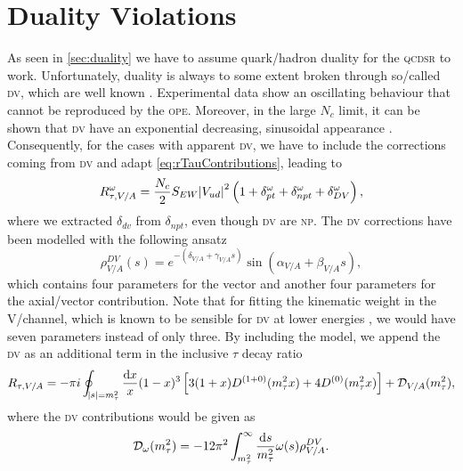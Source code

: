 \documentclass[../../index.tex]{subfiles}
\begin{document}
\section{Duality Violations}
As seen in \cref{sec:duality} we have to assume quark\-/hadron duality for the
\textsc{qcdsr} to work. Unfortunately, duality is always to some extent broken
through so\-/called \textsc{dv}, which are well known \cite{Cata2008,Cata2009}.
Experimental data show an oscillating behaviour that cannot be reproduced by the
\textsc{ope}. Moreover, in the large \(N_c\) limit, it can be shown that
\textsc{dv} have an exponential decreasing, sinusoidal appearance
\cite{Cata2005}. Consequently, for the cases with apparent \textsc{dv}, we have
to include the corrections coming from \textsc{dv} and adapt
\cref{eq:rTauContributions}, leading to
\begin{equation}
  R_{\tau,V/A}^\omega = \frac{N_c}{2}S_{EW} \abs{V_{ud}}^2 \left( 1 + \delta_{pt}^{\omega} + \delta_{npt}^{\omega} + \delta_{DV}^{\omega} \right),
\end{equation}
where we extracted \(\delta_{dv}\) from \(\delta_{npt}\), even though
\textsc{dv} are \textsc{np}. The \textsc{dv} corrections have been modelled with
the following ansatz \cite{Cata2009}
\begin{equation}
  \label{eq:dvModel}
  \rho_{V/A}^{DV}(s) = e^{-(\delta_{V/A}+\gamma_{V/A}s)} \sin(\alpha_{V/A} + \beta_{V/A}s),
\end{equation}
which contains four parameters for the vector and another four parameters for
the axial\-/vector contribution. Note that for fitting the kinematic weight in
the \textsc{V}\-/channel, which is known to be sensible for \textsc{dv} at lower
energies \cite{Boito2011a}, we would have seven parameters instead of only
three. By including the model, we append the \textsc{dv} as an additional term
in the inclusive \(\tau\) decay ratio
\begin{equation}
  R_{\tau,V/A} = - \pi i \oint_{\abs{s}=m_\tau^2} \frac{\dif x}{x} (1 - x)^3 \left[ 3
    (1 + x) D^{(1+0)}(m_\tau^2 x) + 4 D^{(0)}(m_\tau^2 x) \right] +  \mathcal{D}_{V/A}(m_\tau^2),
\end{equation}
where the \textsc{dv} contributions would be given as
\begin{equation}
  \mathcal{D}_\omega(m_\tau^2) = -12 \pi^2 \int_{m_\tau^2}^\infty \frac{\dif s}{m_\tau^2} \omega(s) \rho_{V/A}^{DV}.
\end{equation}
\end{document}
